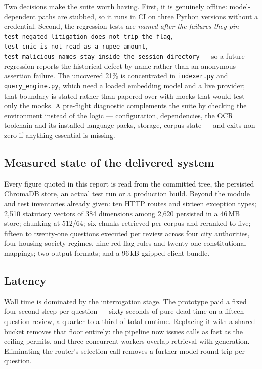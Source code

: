 \documentclass[11pt,a4paper]{article}
\newcommand{\code}[1]{\texttt{\small #1}}
\begin{document}
Two decisions make the suite worth having. First, it is genuinely offline: model-dependent
paths are stubbed, so it runs in CI on three Python versions without a credential. Second,
the regression tests are \emph{named after the failures they pin} ---
\code{test\_negated\_litigation\_does\_not\_trip\_the\_flag},
\code{test\_cnic\_is\_not\_read\_as\_a\_rupee\_amount},
\code{test\_malicious\_names\_stay\_inside\_the\_session\_directory} --- so a future
regression reports the historical defect by name rather than an anonymous assertion failure.
The uncovered 21\% is concentrated in \code{indexer.py} and \code{query\_engine.py}, which
need a loaded embedding model and a live provider; that boundary is stated rather than
papered over with mocks that would test only the mocks. A pre-flight diagnostic complements
the suite by checking the environment instead of the logic --- configuration, dependencies,
the OCR toolchain and its installed language packs, storage, corpus state --- and exits
non-zero if anything essential is missing.

\subsection{Measured state of the delivered system}

Every figure quoted in this report is read from the committed tree, the persisted ChromaDB
store, an actual test run or a production build. Beyond the module and test inventories
already given: ten HTTP routes and sixteen exception types; 2{,}510 statutory vectors of
384 dimensions among 2{,}620 persisted in a 46\,MB store; chunking at 512/64; six chunks
retrieved per corpus and reranked to five; fifteen to twenty-one questions executed per
review across four city authorities, four housing-society regimes, nine red-flag rules and
twenty-one constitutional mappings; two output formats; and a 96\,kB gzipped client bundle.

\subsection{Latency}

Wall time is dominated by the interrogation stage. The prototype paid a fixed four-second
sleep per question --- sixty seconds of pure dead time on a fifteen-question review, a
quarter to a third of total runtime. Replacing it with a shared bucket removes that floor
entirely: the pipeline now issues calls as fast as the ceiling permits, and three
concurrent workers overlap retrieval with generation. Eliminating the router's selection
call removes a further model round-trip per question.
\end{document}
